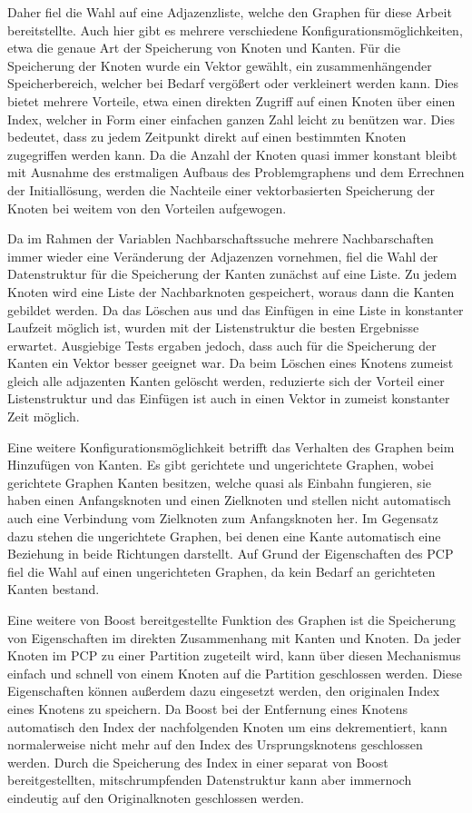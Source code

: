 Daher fiel die Wahl auf eine Adjazenzliste, welche den Graphen für diese Arbeit bereitstellte. Auch hier gibt es mehrere verschiedene Konfigurationsmöglichkeiten, etwa die genaue Art der Speicherung von
Knoten und Kanten. Für die Speicherung der Knoten wurde ein Vektor gewählt, ein zusammenhängender Speicherbereich, welcher bei Bedarf vergößert oder verkleinert werden kann. Dies bietet mehrere Vorteile, etwa
einen direkten Zugriff auf einen Knoten über einen Index, welcher in Form einer einfachen ganzen Zahl leicht zu benützen war. Dies bedeutet, dass zu jedem Zeitpunkt direkt auf einen bestimmten Knoten zugegriffen
werden kann. Da die Anzahl der Knoten quasi immer konstant bleibt mit Ausnahme des erstmaligen Aufbaus des Problemgraphens und dem Errechnen der Initiallösung, werden die Nachteile einer vektorbasierten
Speicherung der Knoten bei weitem von den Vorteilen aufgewogen. 

Da im Rahmen der Variablen Nachbarschaftssuche mehrere Nachbarschaften immer wieder eine Veränderung der Adjazenzen vornehmen, fiel die Wahl der Datenstruktur für die Spei\-cher\-ung der Kanten zunächst auf eine
Liste. Zu jedem Knoten wird eine Liste der Nachbarknoten gespeichert, woraus dann die Kanten gebildet werden. Da das Löschen aus und das Einfügen in eine Liste in konstanter Laufzeit möglich ist, wurden
mit der Listenstruktur die besten Ergebnisse erwartet. Ausgiebige Tests ergaben jedoch, dass auch für die Speicherung der Kanten ein Vektor besser geeignet war. Da beim Löschen eines Knotens zumeist gleich alle adjazenten
Kanten gelöscht werden, reduzierte sich der Vorteil einer Listenstruktur und das Einfügen ist auch in einen Vektor in zumeist konstanter Zeit möglich. 

Eine weitere Konfigurationsmöglichkeit betrifft das Verhalten des Graphen beim Hinzufügen von Kanten. Es gibt gerichtete und ungerichtete Graphen, wobei gerichtete Graphen Kanten besitzen, welche quasi
als Einbahn fungieren, sie haben einen Anfangsknoten und einen Zielknoten und stellen nicht automatisch auch eine Verbindung vom Zielknoten zum Anfangsknoten her. Im Gegensatz dazu stehen die ungerichtete Graphen, bei denen
eine Kante automatisch eine Beziehung in beide Richtungen darstellt. Auf Grund der Eigenschaften des PCP fiel die Wahl auf einen ungerichteten Graphen, da kein Bedarf an gerichteten Kanten bestand.

Eine weitere von Boost bereitgestellte Funktion des Graphen ist die Speicherung von Eigenschaften im direkten Zusammenhang mit Kanten und Knoten. Da jeder Knoten im PCP zu einer Partition zugeteilt wird, kann
über diesen Mechanismus einfach und schnell von einem Knoten auf die Partition geschlossen werden. Diese Eigenschaften können außerdem dazu eingesetzt werden, den originalen Index eines Knotens zu speichern.
Da Boost bei der Entfernung eines Knotens automatisch den Index der nachfolgenden Knoten um eins dekrementiert, kann normalerweise nicht mehr auf den Index des Ursprungsknotens geschlossen werden. Durch
die Speicherung des Index in einer separat von Boost bereitgestellten, mitschrumpfenden Datenstruktur kann aber immernoch eindeutig auf den Originalknoten geschlossen werden. 

